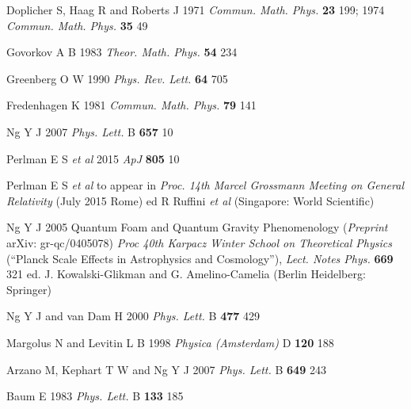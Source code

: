 \documentclass[a4paper]{jpconf}
\begin{document}
\begin{thebibliography}{50}
Doplicher S, Haag R and Roberts J 1971 
{\it Commun. Math. Phys.} {\bf 23} 199;
1974 {\it Commun. Math. Phys.} {\bf 35} 49

Govorkov A B 1983
{\it Theor. Math. Phys.} {\bf 54} 234

Greenberg O W 1990 
{\it Phys. Rev. Lett.} {\bf 64} 705


Fredenhagen K 1981 
{\it Commun. Math. Phys.} {\bf 79} 141


Ng Y J 2007 {\it Phys. Lett.} B {\bf 657} 10


Perlman E S {\it et al} 2015 {\it ApJ} {\bf 805} 10 

Perlman E S {\it et al} to appear in {\it Proc. 14th Marcel Grossmann
Meeting on General Relativity} (July 2015 Rome) ed R Ruffini {\it et al}
(Singapore: World Scientific) 




Ng Y J 2005
Quantum Foam and Quantum Gravity Phenomenology
({\it Preprint} arXiv:
gr-qc/0405078)
{\it Proc 40th Karpacz Winter
School on Theoretical Physics} (``Planck Scale Effects in Astrophysics and
Cosmology''), {\it Lect. Notes
Phys.} {\bf 669} 321
ed. J. Kowalski-Glikman and G. Amelino-Camelia
(Berlin Heidelberg: Springer)

Ng Y J and van Dam H 2000 {\it Phys. Lett.} B {\bf 477} 429

Margolus N and Levitin L B 1998
{\it Physica (Amsterdam)} D {\bf 120} 188






Arzano M, Kephart T W and Ng Y J 2007 {\it Phys. Lett.} B {\bf 649}
243





Baum E 1983 {\it Phys. Lett.} B {\bf 133} 185


\end{thebibliography}
\end{document}
